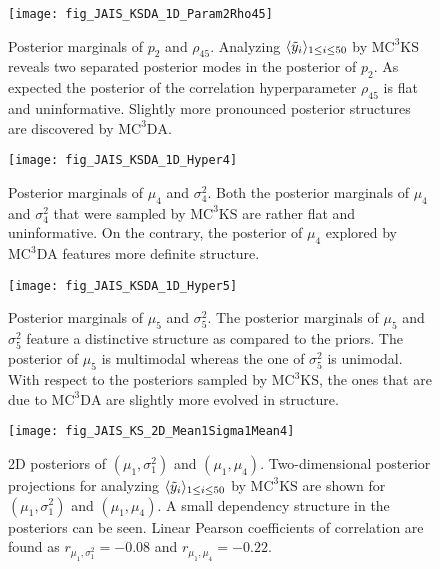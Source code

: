 \begin{figure}[p]
  \centering
  \texttt{[image: fig\_JAIS\_KSDA\_1D\_Param2Rho45]}
  \caption[Posterior marginals of \(p_2\) and \(\rho_{45}\)]{Posterior marginals of \(p_2\) and \(\rho_{45}\).
           Analyzing \(\langle{\tilde{y}_i}\rangle_{1 \leq i \leq 50}\) by \(\text{MC}^3\text{KS}\) reveals two separated posterior modes in the posterior of \(p_2\).
           As expected the posterior of the correlation hyperparameter \(\rho_{45}\) is flat and uninformative.
           Slightly more pronounced posterior structures are discovered by \(\text{MC}^3\text{DA}\).
          }
  \label{res:JAIS:Param2Rho45}
\end{figure}
\begin{figure}[p]
  \centering
  \texttt{[image: fig\_JAIS\_KSDA\_1D\_Hyper4]}
  \caption[Posterior marginals of \(\mu_4\) and \(\sigma^2_4\)]{Posterior marginals of \(\mu_4\) and \(\sigma^2_4\).
           Both the posterior marginals of \(\mu_4\) and \(\sigma^2_4\) that were sampled by \(\text{MC}^3\text{KS}\) are rather flat and uninformative.
           On the contrary, the posterior of \(\mu_4\) explored by \(\text{MC}^3\text{DA}\) features more definite structure.
          }
  \label{res:JAIS:Hyper4}
\end{figure}
\begin{figure}[p]
  \centering
  \texttt{[image: fig\_JAIS\_KSDA\_1D\_Hyper5]}
  \caption[Posterior marginals of \(\mu_5\) and \(\sigma^2_5\)]{Posterior marginals of \(\mu_5\) and \(\sigma^2_5\).
           The posterior marginals of \(\mu_5\) and \(\sigma^2_5\) feature a distinctive structure as compared to the priors.
           The posterior of \(\mu_5\) is multimodal whereas the one of \(\sigma^2_5\) is unimodal.
           With respect to the posteriors sampled by \(\text{MC}^3\text{KS}\), the ones that are due to \(\text{MC}^3\text{DA}\) are slightly more evolved in structure.
          }
  \label{res:JAIS:Hyper5}
\end{figure}
\begin{figure}[p]
  \centering
  \texttt{[image: fig\_JAIS\_KS\_2D\_Mean1Sigma1Mean4]}
  \caption[2D posteriors of \((\mu_1,\sigma_1^2)\) and \((\mu_1,\mu_4)\)]{2D posteriors of \((\mu_1,\sigma_1^2)\) and \((\mu_1,\mu_4)\).
           Two-dimensional posterior projections for analyzing \(\langle{\tilde{y}_i}\rangle_{1 \leq i \leq 50}\) by \(\text{MC}^3\text{KS}\) are shown for \((\mu_1,\sigma_1^2)\) and \((\mu_1,\mu_4)\).
           A small dependency structure in the posteriors can be seen.
           Linear Pearson coefficients of correlation are found as \(r_{\mu_1,\sigma_1^2} = -0.08\) and \(r_{\mu_1,\mu_4} = -0.22\).
          }
  \label{res:JAIS:2D:Mean1Sigma1Mean4}
\end{figure}
